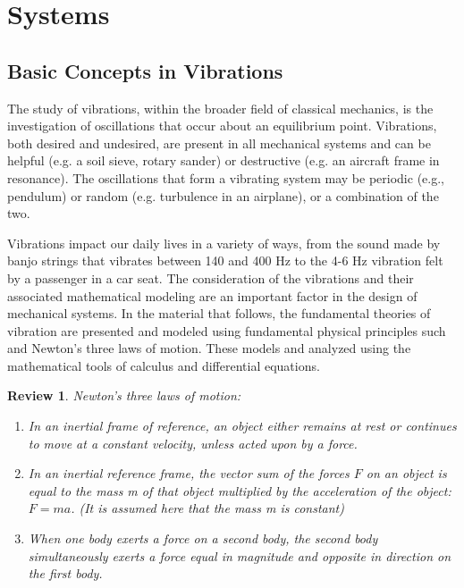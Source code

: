 \documentclass[12pt,letter]{article}
\numberwithin{ex}{section} %
\newtheorem{re}{Review}
\numberwithin{re}{section} %
\newenvironment{review}{\begin{mdframed}[middlelinewidth=2mm,roundcorner=20pt]\begin{re}\normalfont}{\end{re}\end{mdframed}}
\numberwithin{equation}{section}	%
\begin{document}
	
	\setcounter{section}{1}	
	\setcounter{figure}{0}   
	\renewcommand\thefigure{\thesection.\arabic{figure}}


\section{Systems}

	\subsection{Basic Concepts in Vibrations}

    The study of vibrations, within the broader field of classical mechanics, is the investigation of oscillations that occur about an equilibrium point. Vibrations, both desired and undesired, are present in all mechanical systems and can be helpful (e.g. a soil sieve, rotary sander) or destructive (e.g. an aircraft frame in resonance). The oscillations that form a vibrating system may be periodic (e.g., pendulum) or random (e.g. turbulence in an airplane), or a combination of the two. 

    Vibrations impact our daily lives in a variety of ways, from the sound made by banjo strings that vibrates between 140 and 400 Hz to the 4-6 Hz vibration felt by a passenger in a car seat. The consideration of the vibrations and their associated mathematical modeling are an important factor in the design of mechanical systems. In the material that follows, the fundamental theories of vibration are presented and modeled using fundamental physical principles such and Newton's three laws of motion. These models and analyzed using the mathematical tools of calculus and differential equations. 

	\begin{review}
		Newton's three laws of motion:
		\begin{enumerate}
			\item In an inertial frame of reference, an object either remains at rest or continues to move at a constant velocity, unless acted upon by a force.
			\item In an inertial reference frame, the vector sum of the forces $F$ on an object is equal to the mass m of that object multiplied by the acceleration of the object: $F = ma$. (It is assumed here that the mass m is constant)
			\item When one body exerts a force on a second body, the second body simultaneously exerts a force equal in magnitude and opposite in direction on the first body.
		\end{enumerate}
	\end{review}
\end{document}
